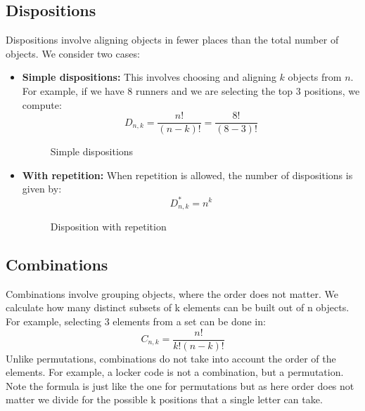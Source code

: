 \subsection{Dispositions}
Dispositions involve aligning objects in fewer places than the total number of objects. We consider two cases:
\begin{itemize}
    \item \textbf{Simple dispositions:} This involves choosing and aligning \( k \) objects from \( n \). For example, if we have 8 runners and we are selecting the top 3 positions, we compute:
    \[
    D_{n,k} = \frac{n!}{(n-k)!} = \frac{8!}{(8-3)!}
    \]
    \vspace{-0.5cm} %
    \begin{figure}[h]
        \centering
        \caption{Simple dispositions}
    \end{figure}
    
    

    
    \item \textbf{With repetition:} When repetition is allowed, the number of dispositions is given by:
    \[
    D^*_{n,k} = n^k
    \]
    \vspace{-0.5cm} %
    \begin{figure}[h]
        \centering
        \caption{Disposition with repetition}
    \end{figure}
    
    
\end{itemize}

\subsection{Combinations}
Combinations involve grouping objects, where the order does not matter. We calculate how many distinct subsets of k elements can be built out of n objects. For example, selecting 3 elements from a set can be done in:
\[
C_{n,k} = \frac{n!}{k!(n-k)!}
\]
Unlike permutations, combinations do not take into account the order of the elements. For example, a locker code is not a combination, but a permutation.  
Note the formula is just like the one for permutations but as here order does not matter we divide for the possible k positions that a single letter can take.


